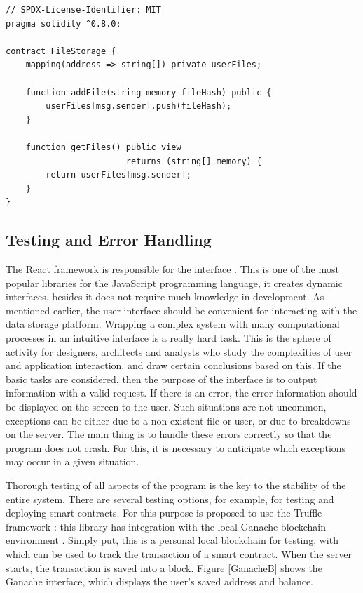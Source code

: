 \documentclass[10pt,conference,a4paper]{IEEEtran_EDM}
\begin{document}

\begin{lstlisting}[caption=Solidity code for a smart contract]
// SPDX-License-Identifier: MIT
pragma solidity ^0.8.0;

contract FileStorage {
    mapping(address => string[]) private userFiles;

    function addFile(string memory fileHash) public {
        userFiles[msg.sender].push(fileHash);
    }

    function getFiles() public view
                        returns (string[] memory) {
        return userFiles[msg.sender];
    }
}
\end{lstlisting}

\subsection{Testing and Error Handling}

The React framework is responsible for the interface \cite{Greg Lim}.
This is one of the most popular libraries for the JavaScript programming language, it creates dynamic interfaces, besides it does not require much knowledge in development.
As mentioned earlier, the user interface should be convenient for interacting with the data storage platform.
Wrapping a complex system with many computational processes in an intuitive interface is a really hard task.
This is the sphere of activity for designers, architects and analysts who study the complexities of user and application interaction, and draw certain conclusions based on this.
If the basic tasks are considered, then the purpose of the interface is to output information with a valid request.
If there is an error, the error information should be displayed on the screen to the user.
Such situations are not uncommon, exceptions can be either due to a non-existent file or user, or due to breakdowns on the server.
The main thing is to handle these errors correctly so that the program does not crash. For this, it is necessary to anticipate which exceptions may occur in a given situation.

Thorough testing of all aspects of the program is the key to the stability of the entire system.
There are several testing options, for example, for testing and deploying smart contracts.
For this purpose is proposed to use the Truffle framework \cite{Truffle}: this library has integration with the local Ganache blockchain environment \cite{Ganache}.
Simply put, this is a personal local blockchain for testing, with which can be used to track the transaction of a smart contract.
When the server starts, the transaction is saved into a block.
Figure \ref{GanacheB} shows the Ganache interface, which displays the user's saved address and balance.
\end{document}
